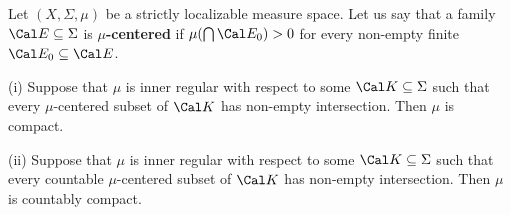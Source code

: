 Let $(X,\Sigma,\mu)$ be a strictly localizable
measure space.   Let us say
that a family $\Cal E\subseteq\Sigma$ is {\bf $\mu$-centered} if
$\mu(\bigcap\Cal E_0)>0$ for every non-empty finite
$\Cal E_0\subseteq\Cal E$.

(i) Suppose that $\mu$ is inner regular with respect to some
$\Cal K\subseteq\Sigma$ such that every $\mu$-centered subset of $\Cal K$
has non-empty intersection.   Then $\mu$ is compact.

(ii) Suppose that $\mu$ is inner regular with respect to some
$\Cal K\subseteq\Sigma$ such that every
countable $\mu$-centered subset of $\Cal K$
has non-empty intersection.   Then $\mu$ is countably compact.

